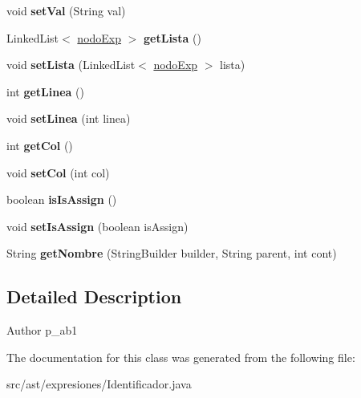 \begin{DoxyCompactItemize}
void {\bfseries set\+Val} (String val)
\item 
\mbox{\label{classast_1_1expresiones_1_1_identificador_a72f16a7d91e176d300e6576c83cd5861}} 
Linked\+List$<$ \mbox{\hyperlink{classentorno_1_1nodo_exp}{nodo\+Exp}} $>$ {\bfseries get\+Lista} ()
\item 
\mbox{\label{classast_1_1expresiones_1_1_identificador_a1e72daab88a2caf01fa5767e0c69f2cb}} 
void {\bfseries set\+Lista} (Linked\+List$<$ \mbox{\hyperlink{classentorno_1_1nodo_exp}{nodo\+Exp}} $>$ lista)
\item 
\mbox{\label{classast_1_1expresiones_1_1_identificador_a233276fbee95cffe1c3aa289b708530a}} 
int {\bfseries get\+Linea} ()
\item 
\mbox{\label{classast_1_1expresiones_1_1_identificador_ae1f07dd6c7503b90861e4798040ac5b5}} 
void {\bfseries set\+Linea} (int linea)
\item 
\mbox{\label{classast_1_1expresiones_1_1_identificador_a13e816233ee376ce7119afd12c12eda7}} 
int {\bfseries get\+Col} ()
\item 
\mbox{\label{classast_1_1expresiones_1_1_identificador_aad40acb7bfbb0f58288cbe1fa0d19b5e}} 
void {\bfseries set\+Col} (int col)
\item 
\mbox{\label{classast_1_1expresiones_1_1_identificador_a2b74b064eb3446b2e1d943cb9fe65f6c}} 
boolean {\bfseries is\+Is\+Assign} ()
\item 
\mbox{\label{classast_1_1expresiones_1_1_identificador_a60cefaa05521398043b79001f6db2753}} 
void {\bfseries set\+Is\+Assign} (boolean is\+Assign)
\item 
\mbox{\label{classast_1_1expresiones_1_1_identificador_a7be778d7639474fe59d9db1614f4bb1b}} 
String {\bfseries get\+Nombre} (String\+Builder builder, String parent, int cont)
\end{DoxyCompactItemize}


\subsection{Detailed Description}
\begin{DoxyAuthor}{Author}
p\+\_\+ab1 
\end{DoxyAuthor}


The documentation for this class was generated from the following file\+:\begin{DoxyCompactItemize}
\item 
src/ast/expresiones/Identificador.\+java\end{DoxyCompactItemize}
